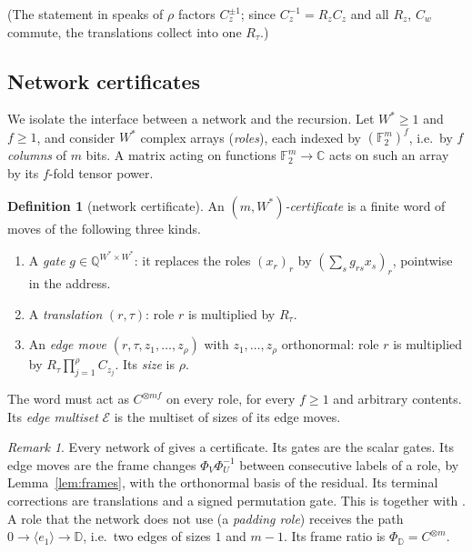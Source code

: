 \documentclass[11pt]{article}
\theoremstyle{definition}
\newtheorem{definition}[theorem]{Definition}
\theoremstyle{remark}
\newtheorem{remark}[theorem]{Remark}
\newcommand{\F}{\mathbb{F}_2}
\newcommand{\C}{\mathbb{C}}
\newcommand{\Q}{\mathbb{Q}}
\newcommand{\E}{\mathcal{E}}
\begin{document}
(The statement in \cite{oai} speaks of $\rho$ factors $C_z^{\pm1}$; since $C_z^{-1}=R_zC_z$ and all $R_z$,
$C_w$ commute, the translations collect into one $R_\tau$.)

\subsection{Network certificates}
We isolate the interface between a network and the recursion. Let $W^*\ge1$ and $f\ge1$, and consider
$W^*$ complex arrays (\emph{roles}), each indexed by $(\F^m)^f$, i.e.\ by $f$ \emph{columns} of $m$ bits.
A matrix acting on functions $\F^m\to\C$ acts on such an array by its $f$-fold tensor power.

\begin{definition}[network certificate]\label{prop:interface}
An \emph{$(m,W^*)$-certificate} is a finite word of moves of the following three kinds.
\begin{enumerate}
\item A \emph{gate} $g\in\Q^{W^*\times W^*}$: it replaces the roles $(x_r)_r$ by $(\sum_sg_{rs}x_s)_r$,
  pointwise in the address.
\item A \emph{translation} $(r,\tau)$: role $r$ is multiplied by $R_\tau$.
\item An \emph{edge move} $(r,\tau,z_1,\dots,z_\rho)$ with $z_1,\dots,z_\rho$ orthonormal: role $r$ is
  multiplied by $R_\tau\prod_{j=1}^\rho C_{z_j}$. Its \emph{size} is $\rho$.
\end{enumerate}
The word must act as $C^{\otimes mf}$ on every role, for every $f\ge1$ and arbitrary contents. Its
\emph{edge multiset} $\E$ is the multiset of sizes of its edge moves.
\end{definition}

\begin{remark}\label{rem:fromnetworks}
Every network of \cite[Section~2]{oai} gives a certificate. Its gates are the scalar gates. Its edge
moves are the frame changes $\Phi_V\Phi_U^{-1}$ between consecutive labels of a role, by
Lemma~\ref{lem:frames}, with the orthonormal basis of the residual. Its terminal corrections are
translations and a signed permutation gate. This is \cite[Proposition~2.4]{oai} together with
\cite[(2.6)]{oai}. A role that the network does not use (a \emph{padding role}) receives the path
$0\to\langle e_1\rangle\to\mathbb D$, i.e.\ two edges of sizes $1$ and $m-1$. Its frame ratio is
$\Phi_{\mathbb D}=C^{\otimes m}$.
\end{remark}
\end{document}
